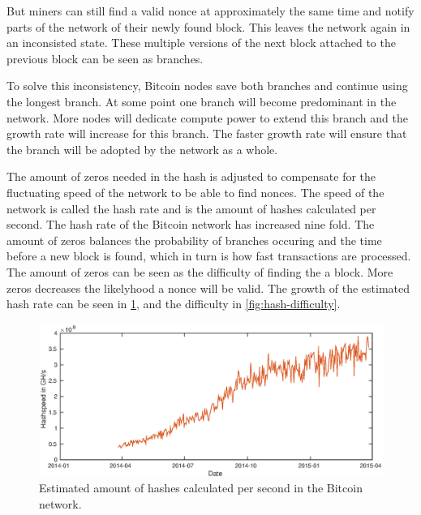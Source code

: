 But miners can still find a valid nonce at approximately the same time
and notify parts of the network of their newly found block.
This leaves the network again in an inconsisted state.
These multiple versions of the next block attached to the previous block can be seen as branches.

To solve this inconsistency, Bitcoin nodes save both branches and continue using the longest branch.
At some point one branch will become predominant in the network.
More nodes will dedicate compute power to extend this branch and the growth rate will increase for this branch.
The faster growth rate will ensure that the branch will be adopted by the network as a whole.

The amount of zeros needed in the hash is adjusted to compensate for the fluctuating speed of the network to be able to find nonces.
The speed of the network is called the hash rate and is the amount of hashes calculated per second.
The hash rate of the Bitcoin network has increased nine fold.
The amount of zeros balances the probability of branches occuring
and the time before a new block is found,
which in turn is how fast transactions are processed.
The amount of zeros can be seen as the difficulty of finding the a block.
More zeros decreases the likelyhood a nonce will be valid.
The growth of the estimated hash rate can be seen in \ref{fig:hash-speed},
and the difficulty in \ref{fig:hash-difficulty}.

\begin{figure}
        \centerline{\includegraphics[scale=0.6]{relatedWork/figs/hashspeed/hashspeed.eps}}
        \caption{Estimated amount of hashes calculated per second in the Bitcoin network.\cite{Blockchain.info-hashspeed}}
	\label{fig:hash-speed}
\end{figure}

